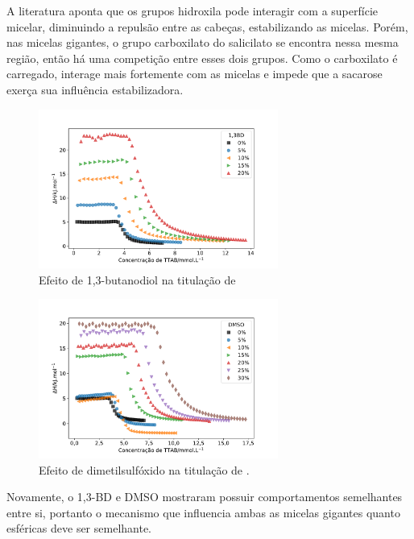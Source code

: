 			A literatura aponta que os grupos hidroxila pode interagir com a superfície micelar, diminuindo a repulsão entre as cabeças, estabilizando as micelas. Porém, nas micelas gigantes, o grupo carboxilato do salicilato se encontra nessa mesma região, então há uma competição entre esses dois grupos. Como o carboxilato é carregado, interage mais fortemente com as micelas e impede que a sacarose exerça sua influência estabilizadora. 
			
			\begin{figure}[h]
				\centering
				\includegraphics[width=0.7\textwidth]{imagens/itc/ITC_13BD}
				\caption{Efeito de 1,3-butanodiol na titulação de \TTAB}
				\label{fig:itc_13bd}
			\end{figure} 
		
			\begin{figure}[h]
				\centering
				\includegraphics[width=0.7\textwidth]{imagens/itc/ITC_dmso}
				\caption{Efeito de dimetilsulfóxido na titulação de \TTAB.}
				\label{fig:itc_dmso}
			\end{figure}
			
			Novamente, o 1,3-BD e DMSO mostraram possuir comportamentos semelhantes entre si, portanto o mecanismo que influencia ambas as micelas gigantes quanto esféricas deve ser semelhante.
			
